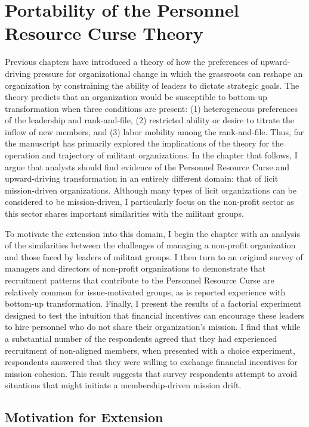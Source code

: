 \chapter{Portability of the Personnel Resource Curse Theory}
\label{chap:survey}
 
Previous chapters have introduced a theory of how the preferences of upward-driving pressure for organizational change in which the grassroots can reshape an organization by constraining the ability of leaders to dictate strategic goals. The theory predicts that an organization would be susceptible to bottom-up transformation when three conditions are present: (1) heterogeneous preferences of the leadership and rank-and-file, (2) restricted ability or desire to titrate the inflow of new members, and (3) labor mobility among the rank-and-file.  Thus, far the manuscript has primarily explored the implications of the theory for the operation and trajectory of militant organizations. In the chapter that follows, I argue that analysts should find evidence of the Personnel Resource Curse and upward-driving transformation in an entirely different domain: that of licit mission-driven organizations. Although many types of licit organizations can be considered to be mission-driven, I particularly focus on the non-profit sector as this sector shares important similarities with the militant groups. 

To motivate the extension into this domain, I begin the chapter with an analysis of the similarities between the challenges of managing a non-profit organization and those faced by leaders of militant groups.  I then turn to an original survey of managers and directors of non-profit organizations to demonstrate that recruitment patterns that contribute to the Personnel Resource Curse are relatively common for issue-motivated groups, as is reported experience with bottom-up transformation. Finally, I present the results of a factorial experiment designed to test the intuition that financial incentives can encourage these leaders to hire personnel who do not share their organization's mission. I find that while a substantial number of the respondents agreed that they had experienced recruitment of non-aligned members, when presented with a choice experiment, respondents answered that they were willing to exchange financial incentives for mission cohesion. This result suggests that survey respondents attempt to avoid situations that might initiate a membership-driven mission drift.

\section{Motivation for Extension}

